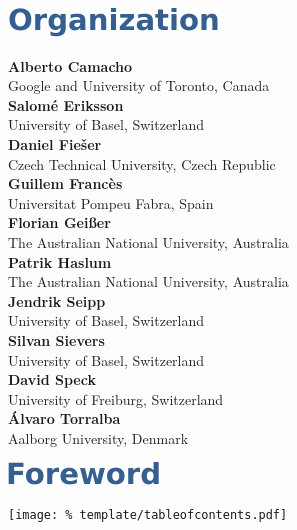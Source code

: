 \documentclass[letterpaper]{article}
\begin{document}

\cleardoublepage

\vspace*{5mm}
\includegraphics[trim={15pt 0pt 0pt 0pt}]{template/organization.pdf}

\vspace*{14mm}
\noindent
\textbf{Alberto Camacho}\\
Google and University of Toronto, Canada\\[1em]
\textbf{Salom\'{e} Eriksson}\\
University of Basel, Switzerland\\[1em]
\textbf{Daniel Fie\v{s}er}\\
Czech Technical University, Czech Republic\\[1em]
\textbf{Guillem Franc\`es}\\
Universitat Pompeu Fabra, Spain\\[1em]
\textbf{Florian Gei{\ss}er}\\
The Australian National University, Australia\\[1em]
\textbf{Patrik Haslum}\\
The Australian National University, Australia\\[1em]
\textbf{Jendrik Seipp}\\
University of Basel, Switzerland\\[1em]
\textbf{Silvan Sievers}\\
University of Basel, Switzerland\\[1em]
\textbf{David Speck}\\
University of Freiburg, Switzerland\\[1em]
\textbf{\'{A}lvaro Torralba}\\
Aalborg University, Denmark

\clearpage

\vspace*{5mm}
\includegraphics[trim={15pt 0pt 0pt 0pt}]{template/preface.pdf}


\clearpage

\vspace*{5mm}
\texttt{[image: \%
 template/tableofcontents.pdf]}

\renewcommand\contentsname{}
\tableofcontents

\cleardoublepage
{}

\end{document}
